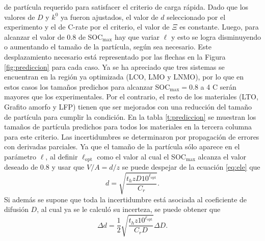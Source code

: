 de partícula requerido para satisfacer el criterio de carga rápida. Dado que los
valores de $D$ y $k^0$ ya fueron ajustados, el valor de $d$ seleccionado por el
experimento y el de C-rate por el criterio, el valor de $\Xi$ es constante. Luego,
para alcanzar el valor de 0.8 de SOC$_{\max}$ hay que variar $\ell$ y esto se
logra disminuyendo o aumentando el tamaño de la partícula, según sea necesario. 
Este desplazamiento necesario está representado por las flechas en la Figura 
\ref{fig:prediccion} para cada caso. Ya se ha apreciado que tres sistemas se 
encuentran en la región ya optimizada (LCO, LMO y LNMO), por lo que en estos casos
los tamaños predichos para alcanzar SOC$_{\max} = 0.8$ a 4 C serán mayores que 
los experimentales. Por el contrario, el resto de los materiales (LTO, Grafito
amorfo y LFP) tienen que ser mejorados con una reducción del tamaño de partícula
para cumplir la condición. En la tabla \ref{t:prediccion} se muestran los tamaños
de partícula predichos para todos los materiales en la tercera columna para este
criterio. Las incertidumbres se determinaron por propagación de errores con 
derivadas parciales. Ya que el tamaño de la partícula sólo aparece en el parámetro
$\ell$, al definir $\ell_{\text{opt}}$ como el valor al cual el SOC$_{\max}$ 
alcanza el valor deseado de 0.8 y usar que $V/A = d/z$ se puede despejar de la 
ecuación \ref{eq:ele} que
\begin{equation}
    d = \sqrt{\frac{t_h z D 10^{\ell_{\text{opt}}}}{C_r}}.
\end{equation}
Si además se supone que toda la incertidumbre está asociada al coeficiente de 
difusión $D$, al cual ya se le calculó su incerteza, se puede obtener que
\begin{equation}
    \Delta d = \frac{1}{2} \sqrt{\frac{t_h z 10^{\ell_{\text{opt}}}}{C_r D}} \Delta D.
\end{equation}

